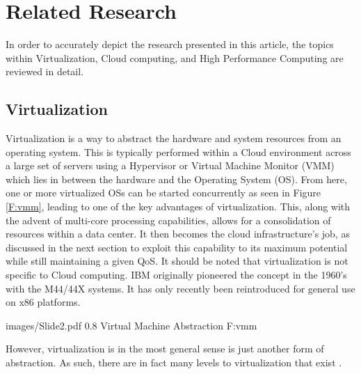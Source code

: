 
\chapter{Related Research}
\label{chap:related}

In order to accurately depict the research presented in this article, the topics within Virtualization,  Cloud computing, and High Performance Computing are reviewed in detail. 

\section{Virtualization}
\label{sec:virtualization}


Virtualization is a way to abstract the hardware and system resources from an operating system.  This is typically performed  within a Cloud environment across a large set of servers using a Hypervisor or Virtual Machine Monitor (VMM) which lies in between the hardware and the Operating System (OS). From here, one or more virtualized OSs can be started concurrently as seen in Figure \ref{F:vmm}, leading to one of the key advantages of virtualization.  This, along with the advent of multi-core processing capabilities, allows for a consolidation of resources within a data center.  It then becomes the cloud infrastructure's job, as discussed in the next section to exploit this capability to its maximum potential while still maintaining a given QoS. It should be noted that virtualization is not specific to Cloud computing. IBM originally pioneered the concept in the 1960's with the M44/44X systems.  It has only recently been reintroduced for general use on x86 platforms. 


  {images/Slide2.pdf}
  {0.8}
  {Virtual Machine Abstraction}
  {F:vmm}
 

However, virtualization is in the most general sense is just another form of abstraction. As such, there are in fact many levels to virtualization that exist \cite{hwang2012distributed}. 


